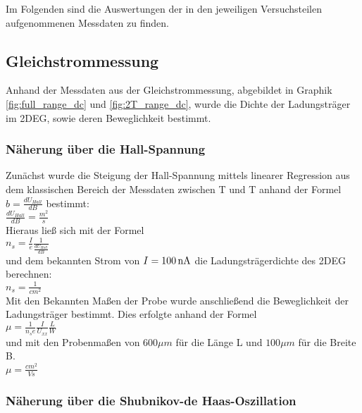 

Im Folgenden sind die Auswertungen der in den jeweiligen Versuchsteilen aufgenommenen Messdaten zu finden. 

\subsection{Gleichstrommessung}
\label{Auswertung_Gleichstrom}

Anhand der Messdaten aus der Gleichstrommessung, abgebildet in Graphik \ref{fig:full_range_dc} und \ref{fig:2T_range_dc}, wurde die Dichte der Ladungsträger im 2DEG, sowie deren Beweglichkeit bestimmt.

\subsubsection{Näherung über die Hall-Spannung}
\label{Über die Hall-Spannung}

 Zunächst wurde die Steigung der Hall-Spannung mittels linearer Regression aus dem klassischen Bereich der Messdaten zwischen \unit[-2]{T} und \unit[2]{T} anhand der Formel $b=\frac{dU_{Hall}}{dB}$  
bestimmt: \\

$\frac{dU_{Hall}}{dB}=  \frac{m^2}{s}$  %
\\
Hieraus ließ sich mit der Formel 
\\
$n_s=\frac{I}{e}\frac{1}{\frac{dU_{Hall}}{dB}}$ 
\\
und dem bekannten Strom von $I=\unit[100]{nA}$ die Ladungsträgerdichte des 2DEG berechnen: 
\\
$n_s= \frac{1}{cm^2}$    %
\\
Mit den Bekannten Maßen der Probe wurde anschließend die Beweglichkeit der Ladungsträger bestimmt. Dies erfolgte anhand der Formel \\
$\mu=\frac{1}{n_se}\frac{I}{U_{xx}}\frac{L}{W}$
\\
und mit den Probenmaßen von $600\mu m$ für die Länge L und $100\mu m$  für die Breite B. \\

$\mu= \frac{cm^2}{Vs}$  %

\subsubsection{Näherung über die Shubnikov-de Haas-Oszillation}
\label{Über die SDH-Oszillation}

